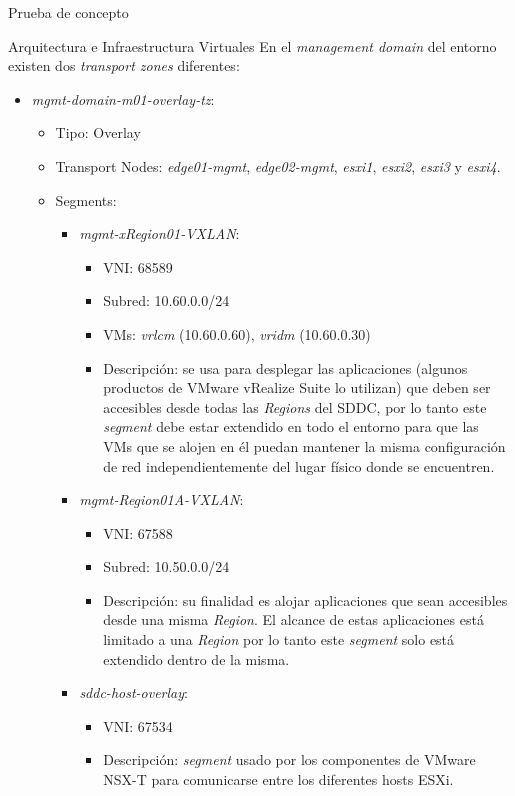 \begin{section}{Prueba de concepto}
\begin{subsection}{Arquitectura e Infraestructura Virtuales\cite{CFVirtInfraes}}
En el \textit{management domain} del entorno existen dos \textit{transport zones} diferentes:
\begin{itemize}
  \item \textit{mgmt-domain-m01-overlay-tz}:
    \begin{itemize}
      \item Tipo: Overlay
      \item Transport Nodes: \textit{edge01-mgmt}, \textit{edge02-mgmt}, \textit{esxi1}, \textit{esxi2}, \textit{esxi3} y \textit{esxi4}.
      \item Segments:
        \begin{itemize}
          \item \textit{mgmt-xRegion01-VXLAN}:
            \begin{itemize}
              \item VNI: 68589
              \item Subred: 10.60.0.0/24
              \item VMs: \textit{vrlcm} (10.60.0.60), \textit{vridm} (10.60.0.30)
              \item Descripción: se usa para desplegar las aplicaciones (algunos productos de VMware vRealize Suite lo utilizan) que deben ser accesibles desde todas las \textit{Regions} del SDDC, por lo tanto este \textit{segment} debe estar extendido en todo el entorno para que las VMs que se alojen en él puedan mantener la misma configuración de red independientemente del lugar físico donde se encuentren.
            \end{itemize}
          \item \textit{mgmt-Region01A-VXLAN}:
            \begin{itemize}
              \item VNI: 67588
              \item Subred: 10.50.0.0/24
              \item Descripción: su finalidad es alojar aplicaciones que sean accesibles desde una misma \textit{Region}. El alcance de estas aplicaciones está limitado a una \textit{Region} por lo tanto este \textit{segment} solo está extendido dentro de la misma.
            \end{itemize}
          \item \textit{sddc-host-overlay}:
            \begin{itemize}
              \item VNI: 67534
              \item Descripción: \textit{segment} usado por los componentes de VMware NSX-T para comunicarse entre los diferentes hosts ESXi.

\end{itemize}
\end{itemize}
\end{itemize}
\end{itemize}
\end{subsection}
\end{section}
